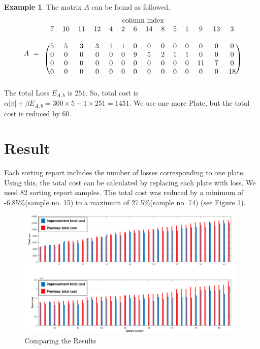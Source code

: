 \documentclass[a4paper]{amsart}
\numberwithin{equation}{section} %
\numberwithin{figure}{section} %
\numberwithin{table}{section}
\theoremstyle{plain}
\theoremstyle{definition}
\newtheorem{example}[thm]{Example}
\theoremstyle{plain}
\theoremstyle{plain}
\theoremstyle{plain}
\theoremstyle{plain}
\theoremstyle{plain}
\begin{document}
\begin{example}
\noindent	
The matrix $A$ can be found as followed.
\begin{equation*}
\begin{array}{rc}
&\text{column index}\\
A\,\,=&
\begin{blockarray}{cccccccccccccc}
7 & 10 & 11 & 12 & 4 & 2 & 6 & 14 & 8 & 5 & 1 & 9 & 13 & 3\\
&&&&&&&&&&&&&\\
\begin{block}{(cccccccccccccc)}
5 & 5 & 3 & 3 & 1 & 1 & 0 & 0 & 0 & 0 & 0 & 0 & 0 & 0 \\
0 & 0 & 0 & 0 & 0 & 0 & 9 & 5 & 2 & 1 & 1 & 0 & 0 & 0 \\
0 & 0 & 0 & 0 & 0 & 0 & 0 & 0 & 0 & 0 & 0 & 11& 7 & 0 \\
0 & 0 & 0 & 0 & 0 & 0 & 0 & 0 & 0 & 0 & 0 & 0 & 0 & 18\\
\end{block}
\end{blockarray}
\end{array}
\end{equation*}
\noindent
The total Loss $E_{A,b}$ is $251$. So, total cost is $\alpha|\pi|+\beta E_{A,b}=300 \times 5+1 \times 251 =1451$. We use one more Plate, but the total cost is reduced by $60$.
	

	
\end{example}



\section{Result}\label{sec:Result}

Each sorting report includes the number of losses corresponding to one plate. 
Using this, the total cost can be calculated by replacing each plate with loss. 
We used 82 sorting report samples.
The total cost was reduced by a minimum of -6.85\%(sample no. 15) to a maximum of 27.5\%(sample no. 74) (see Figure \ref{fig:Comparing}).

\begin{figure}[h!]
	\centering
	\includegraphics[width=11cm]{Graph_2.pdf}
	\caption{Comparing the Results}
	\label{fig:Comparing}       %
\end{figure}
\end{document}
